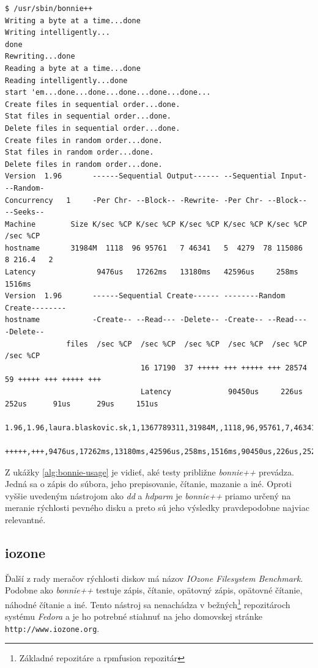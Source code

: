 \renewcommand{\lstlistingname}{Ukážka}
\begin{lstlisting}[label=alg:bonnie-usage,caption=Príklad použitia nástroja Bonnie++]
$ /usr/sbin/bonnie++
Writing a byte at a time...done
Writing intelligently...
done
Rewriting...done
Reading a byte at a time...done
Reading intelligently...done
start 'em...done...done...done...done...done...
Create files in sequential order...done.
Stat files in sequential order...done.
Delete files in sequential order...done.
Create files in random order...done.
Stat files in random order...done.
Delete files in random order...done.
Version  1.96       ------Sequential Output------ --Sequential Input- --Random-
Concurrency   1     -Per Chr- --Block-- -Rewrite- -Per Chr- --Block-- --Seeks--
Machine        Size K/sec %CP K/sec %CP K/sec %CP K/sec %CP K/sec %CP  /sec %CP
hostname       31984M  1118  96 95761   7 46341   5  4279  78 115086   8 216.4   2
Latency              9476us   17262ms   13180ms   42596us     258ms    1516ms
Version  1.96       ------Sequential Create------ --------Random Create--------
hostname            -Create-- --Read--- -Delete-- -Create-- --Read--- -Delete--
              files  /sec %CP  /sec %CP  /sec %CP  /sec %CP  /sec %CP  /sec %CP
                               16 17190  37 +++++ +++ +++++ +++ 28574  59 +++++ +++ +++++ +++
                               Latency             90450us     226us     252us      91us      29us     151us
                               1.96,1.96,laura.blaskovic.sk,1,1367789311,31984M,,1118,96,95761,7,46341,5,4279,78,115086,8,216.4,2,16,,,,,17190,37,+++++,+++,+++++,+++,28574,59,+++++,+++,
                               +++++,+++,9476us,17262ms,13180ms,42596us,258ms,1516ms,90450us,226us,252us,91us,29us,151us
\end{lstlisting}
\renewcommand{\lstlistingname}{\listingAlgoritmus}

Z ukážky \ref{alg:bonnie-usage} je vidieť, aké testy približne \emph{bonnie++}
prevádza. Jedná sa o zápis do súbora, jeho prepisovanie, čítanie, mazanie a
iné. Oproti vyššie uvedeným nástrojom ako \emph{dd} a \emph{hdparm} je
\emph{bonnie++} priamo určený na meranie rýchlosti pevného disku a preto sú
jeho výsledky pravdepodobne najviac relevantné.

%
%

\subsection{iozone}

Ďalší z rady meračov rýchlosti diskov má názov \emph{IOzone Filesystem
Benchmark}. Podobne ako \emph{bonnie++} testuje zápis, čítanie, opätovný zápis,
opätovné čítanie, náhodné čítanie a iné. Tento nástroj sa nenachádza v
bežných\footnote{Základné repozitáre a rpmfusion repozitár} repozitároch
systému \emph{Fedora} a je ho potrebné stiahnuť na jeho domovskej stránke
\texttt{http://www.iozone.org}.

